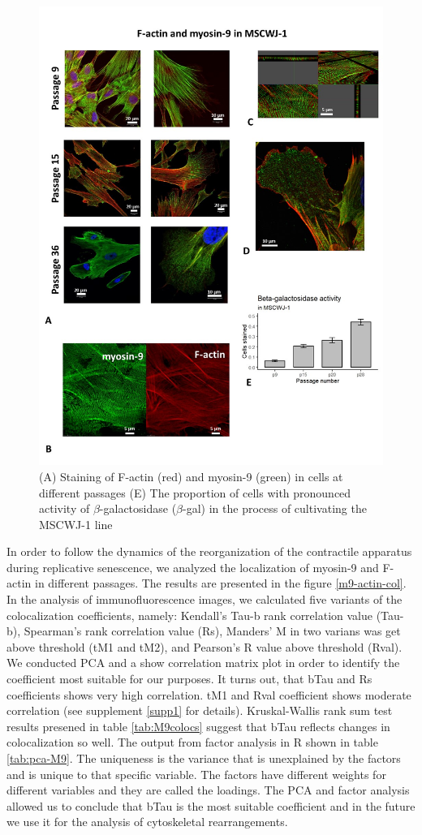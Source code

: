 \documentclass[english,authoryear]{elsarticle}
\begin{document}
\begin{figure}[hbt!]
  \label{m9-actin-bgal}
\centering
\includegraphics[width=0.9\linewidth]{fig_m9-actin-bgal.jpg}
\caption{(A) Staining of F-actin (red) and myosin-9 (green) in cells at different passages (E) The proportion of cells with pronounced activity of $\beta$-galactosidase ($\beta$-gal) in the process of cultivating the MSCWJ-1 line}
\end{figure}


In order to follow the dynamics of the reorganization of the contractile apparatus during replicative senescence, we analyzed the localization of myosin-9 and F-actin in different passages.
The results are presented in the figure \ref{m9-actin-col}.
In the analysis of immunofluorescence images, we calculated five variants of the colocalization coefficients, namely: Kendall's Tau-b rank correlation value (Tau-b), Spearman's rank correlation value (Rs), Manders' M in two varians was get above threshold (tM1 and tM2), and Pearson's R value above threshold (Rval).
We conducted PCA and a show correlation matrix plot in order to identify the coefficient most suitable for our purposes.
It turns out, that bTau and Rs coefficients shows very high correlation.
tM1 and Rval coefficient shows moderate correlation (see supplement \ref{supp1} for details).
Kruskal-Wallis rank sum test results presened in table \ref{tab:M9colocs} suggest that bTau reflects changes in colocalization so well.
The output from factor analysis in R shown in table \ref{tab:pca-M9}.
The uniqueness is the variance that is unexplained by the factors and is unique to that specific variable.
The factors have different weights for different variables and they are called the loadings.
The PCA and factor analysis allowed us to conclude that bTau is the most suitable coefficient and in the future we use it for the analysis of cytoskeletal rearrangements.
\end{document}
